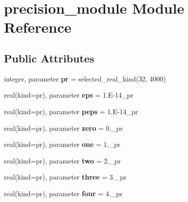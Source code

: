 \hypertarget{classprecision__module}{\section{precision\-\_\-module Module Reference}
\label{classprecision__module}
}
\subsection*{Public Attributes}
\begin{DoxyCompactItemize}
\item 
\hypertarget{classprecision__module_a666769eb09991cb5f073620c9042674e}{integer, parameter {\bfseries pr} = selected\-\_\-real\-\_\-kind(32, 4000)}\label{classprecision__module_a666769eb09991cb5f073620c9042674e}

\item 
\hypertarget{classprecision__module_af1c73fb151b9820e507052293ef6e4bf}{real(kind=pr), parameter {\bfseries eps} = 1.\-E-\/14\-\_\-pr}\label{classprecision__module_af1c73fb151b9820e507052293ef6e4bf}

\item 
\hypertarget{classprecision__module_a0e5314b479911716c1a708ef3ffe4aa9}{real(kind=pr), parameter {\bfseries peps} = 1.\-E-\/14\-\_\-pr}\label{classprecision__module_a0e5314b479911716c1a708ef3ffe4aa9}

\item 
\hypertarget{classprecision__module_a5c4729f5ae76a54c36ac15655ce815ef}{real(kind=pr), parameter {\bfseries zero} = 0.\-\_\-pr}\label{classprecision__module_a5c4729f5ae76a54c36ac15655ce815ef}

\item 
\hypertarget{classprecision__module_a9985a1c3ada8b0f360aecd58a7da0209}{real(kind=pr), parameter {\bfseries one} = 1.\-\_\-pr}\label{classprecision__module_a9985a1c3ada8b0f360aecd58a7da0209}

\item 
\hypertarget{classprecision__module_a97a3cf9023f43607709fcf9f79f4cf2d}{real(kind=pr), parameter {\bfseries two} = 2.\-\_\-pr}\label{classprecision__module_a97a3cf9023f43607709fcf9f79f4cf2d}

\item 
\hypertarget{classprecision__module_a974fae5c7034e0f3942510dd7f07c50c}{real(kind=pr), parameter {\bfseries three} = 3.\-\_\-pr}\label{classprecision__module_a974fae5c7034e0f3942510dd7f07c50c}

\item 
\hypertarget{classprecision__module_af213aa02e1e91ee1be1e7f9d6ebf1ffc}{real(kind=pr), parameter {\bfseries four} = 4.\-\_\-pr}\label{classprecision__module_af213aa02e1e91ee1be1e7f9d6ebf1ffc}


\end{DoxyCompactItemize}
